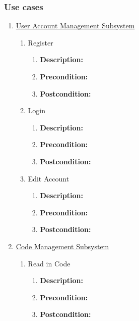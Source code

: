 \documentclass{article}
\begin{document}
	\subsubsection{Use cases}
	\begin{enumerate}
		\item \underline{User Account Management Subsystem}
			
		
	\begin{enumerate}
		\item Register
		\begin{enumerate}
			\item \textbf{Description:} 
			\item \textbf{Precondition:}
			\item \textbf{Postcondition:}\newline
		\end{enumerate}
		
		\item Login
		\begin{enumerate}
			\item \textbf{Description:} 
			\item \textbf{Precondition:}
			\item \textbf{Postcondition:}\newline
		\end{enumerate}
		
		
		\item Edit Account
		\begin{enumerate}
			\item \textbf{Description:} 
			\item \textbf{Precondition:} 
			\item \textbf{Postcondition:}\newline
		\end{enumerate}
	\end{enumerate}
	
	
	\item \underline{Code Management Subsystem}
    \begin{enumerate}
    	\item Read in Code
		\begin{enumerate}
			\item \textbf{Description:} 
			\item \textbf{Precondition:}
			\item \textbf{Postcondition:}\newline
		\end{enumerate}
        

\end{enumerate}
\end{enumerate}
\end{document}
